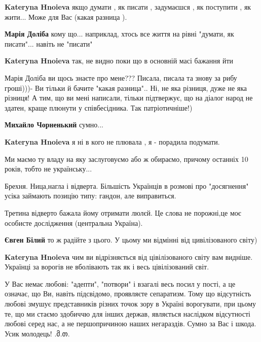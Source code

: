 \begin{itemize}
\begin{itemize}
\textbf{Kateryna Hnoieva} якщо думати , як писати , задумаєшся , як поступити , як жити... Може для Вас (какая разница ).

\textbf{Марія Доліба} кому що... наприклад, хтось все життя на рівні "думати, як писати"... навіть не "писати"

\textbf{Kateryna Hnoieva} так, не видно поки що в основній масі бажання йти

Марія Доліба ви щось знаєте про мене???
Писала, писала та знову за рибу гроші)))-
Ви тільки й бачите "какая разница"..
Ні, не яка різниця, дуже не яка різниця!
А тим, що ви мені написали, тільки підтвержує, що на діалог народ не здатен, краще плюнути у співбесідника. Так патріотичніше!)

\textbf{Михайло Чорненький} сумно...

\textbf{Kateryna Hnoieva} я ні в кого не плювала , я - порадила подумати.

\end{itemize} %

Ми маємо ту владу на яку заслуговуємо або ж обираємо, причому останніх 10 років, тобто не українську...


Брехня. Ница,нагла і відверта. Більшість Українців в розмові про "досягнення"
усіка займають позицію типу: гандон, але виправиться.

Третина відверто бажала йому отримати люлєй. Це слова не порожні,це моє
особисте дослідження (центральна Україна).

\begin{itemize} %
\textbf{Євген Білий} то ж радійте з цього. У цьому ми відмінні від цивілізованого світу)

\textbf{Kateryna Hnoieva} чим ви відрізняється від цівілізованого світу вам видніше. Українці за ворогів не вболівають так як і весь цівілізований світ.
\end{itemize} %




У Вас немає любові: "адепти", "потвори" і взагалі весь посил у пості, а це
означає, що Ви, навіть підсвідомо, проявляєте сепаратизм. Тому що відсутність
любові змушує представників різних точок зору в Україні ворогувати, при цьому
те, що ми стаємо здобиччю для інших держав, являється наслідком відсутності
любові серед нас, а не першопричиною наших негараздів. Сумно за Вас і шкода.
Усик молодець! .მ.თ.


\end{itemize}
